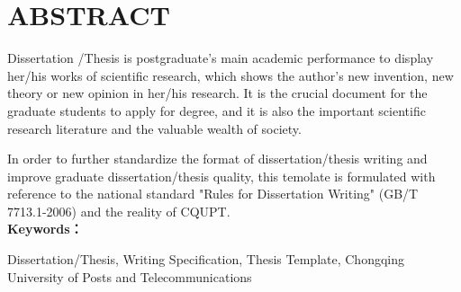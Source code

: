 



\chapter{ABSTRACT}
\xiaosi

Dissertation /Thesis is postgraduate’s main academic performance to display her/his works of scientific research, which shows the author’s new invention, new theory or new opinion in her/his research. It is the crucial document for the graduate students to apply for degree, and it is also the important scientific research literature and the valuable wealth of society.

In order to further standardize the format of dissertation/thesis writing and improve graduate dissertation/thesis quality, this temolate is formulated with reference to the national standard "Rules for Dissertation Writing" (GB/T 7713.1-2006) and the reality of CQUPT.
\\

\noindent\textbf{Keywords：} 
\begin{minipage}[t]{0.85\linewidth}
	Dissertation/Thesis, Writing Specification, Thesis Template, Chongqing University of Posts and Telecommunications
\end{minipage}

\clearpage